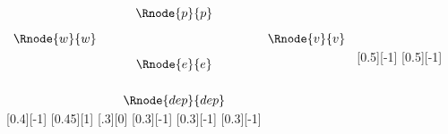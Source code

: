 $
\begin{array}{c p{0.05cm}c p{0.5cm}c}
                        & & \Rnode{p}{p}& &             \\ [0.3cm]
	 \Rnode{w}{w}	& &                   & & \Rnode{v}{v} \\ [0.3cm]     
	                      & & \Rnode{e}{e}      & &             \\ [0.6cm]     
	                      & & \Rnode{dep}{dep}  & &             
\end{array}
$
[0.5][-1]
\idcomp
{} 
[0.5][-1]
\idcomp
{} 
\idcomp
{}
[0.4][-1]
\idcomp
{}
[0.45][1]
\idcomp
{}
[.3][0]
[0.3][-1]
\idcomp
{}
[0.3][-1]
[0.3][-1]